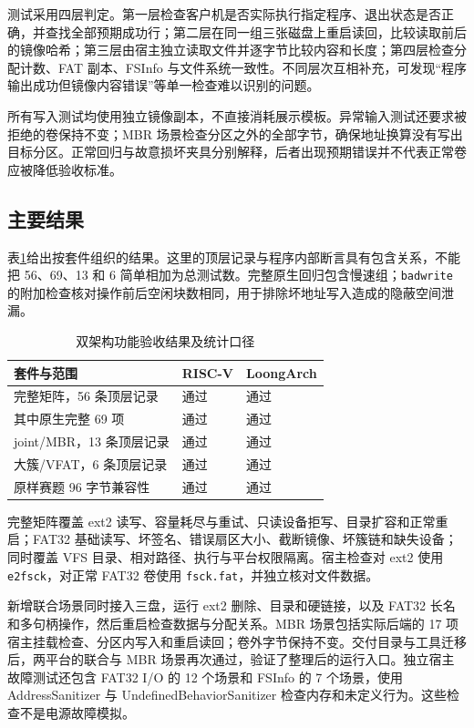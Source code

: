 \documentclass[conference]{IEEEtran}
\newcommand{\code}[1]{\texttt{#1}}
\begin{document}
测试采用四层判定。第一层检查客户机是否实际执行指定程序、退出状态是否正确，并查找全部预期成功行；第二层在同一组三张磁盘上重启读回，比较读取前后的镜像哈希；第三层由宿主独立读取文件并逐字节比较内容和长度；第四层检查分配计数、FAT 副本、FSInfo 与文件系统一致性。不同层次互相补充，可发现“程序输出成功但镜像内容错误”等单一检查难以识别的问题。

所有写入测试均使用独立镜像副本，不直接消耗展示模板。异常输入测试还要求被拒绝的卷保持不变；MBR 场景检查分区之外的全部字节，确保地址换算没有写出目标分区。正常回归与故意损坏夹具分别解释，后者出现预期错误并不代表正常卷应被降低验收标准。

\subsection{主要结果}
表\ref{tab:results}给出按套件组织的结果。这里的顶层记录与程序内部断言具有包含关系，不能把 56、69、13 和 6 简单相加为总测试数。完整原生回归包含慢速组；\code{badwrite} 的附加检查核对操作前后空闲块数相同，用于排除坏地址写入造成的隐蔽空间泄漏。

\begin{table}[t]
\caption{双架构功能验收结果及统计口径}
\label{tab:results}
\centering
\begin{tabular}{p{3.65cm}p{1.6cm}p{1.65cm}}
\toprule
套件与范围 & RISC-V & LoongArch \\
\midrule
完整矩阵，56 条顶层记录 & 通过 & 通过 \\
其中原生完整 69 项 & 通过 & 通过 \\
joint/MBR，13 条顶层记录 & 通过 & 通过 \\
大簇/VFAT，6 条顶层记录 & 通过 & 通过 \\
原样赛题 96 字节兼容性 & 通过 & 通过 \\
\bottomrule
\end{tabular}
\end{table}

完整矩阵覆盖 ext2 读写、容量耗尽与重试、只读设备拒写、目录扩容和正常重启；FAT32 基础读写、坏签名、错误扇区大小、截断镜像、坏簇链和缺失设备；同时覆盖 VFS 目录、相对路径、执行与平台权限隔离。宿主检查对 ext2 使用 \code{e2fsck}，对正常 FAT32 卷使用 \code{fsck.fat}，并独立核对文件数据。

新增联合场景同时接入三盘，运行 ext2 删除、目录和硬链接，以及 FAT32 长名和多句柄操作，然后重启检查数据与分配关系。MBR 场景包括实际后端的 17 项宿主挂载检查、分区内写入和重启读回；卷外字节保持不变。交付目录与工具迁移后，两平台的联合与 MBR 场景再次通过，验证了整理后的运行入口。独立宿主故障测试还包含 FAT32 I/O 的 12 个场景和 FSInfo 的 7 个场景，使用 AddressSanitizer 与 UndefinedBehaviorSanitizer 检查内存和未定义行为。这些检查不是电源故障模拟。
\end{document}
